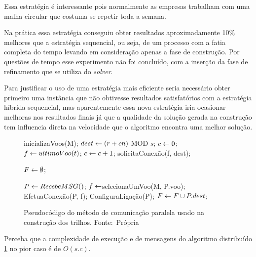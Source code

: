 Essa estratégia é interessante pois normalmente as empresas trabalham com uma
malha circular que costuma se repetir toda a semana.

Na prática essa estratégia conseguiu obter resultados aproximadamente 10\%
melhores que a estratégia sequencial, ou seja, de um processo com a fatia
completa do tempo levando em consideração apenas a fase de construção. Por
questões de tempo esse experimento não foi concluído, com a inserção da fase de
refinamento que se utiliza do \textit{solver}.

Para justificar o uso de uma estratégia mais eficiente seria necessário obter
primeiro uma instância que não obtivesse resultados satisfatórios com a
estratégia híbrida sequencial, mas aparentemente essa nova estratégia iria
ocasionar melhoras nos resultados finais já que a qualidade da solução
gerada na construção tem influencia direta na velocidade que o algoritmo
encontra uma melhor solução.

\begin{figure}[h]
\caption{Pseudocódigo do método de comunicação paralela usado na construção dos
trilhos.
\newline
\mbox{Fonte: Própria}}\label{alg:metodoparalel}
\begin{programma}

\STATE inicializaVoos(M);
\STATE $dest \leftarrow (r + cn)$ MOD $s$;
\STATE $c \leftarrow 0$;
\STATE $f \leftarrow ultimoVoo(t)$;
	\STATE $c \leftarrow c + 1$;
	\STATE solicitaConexão(f, dest);
	\ENDIF
\ENDFOR

\ENDFOR

\STATE $F \leftarrow \emptyset$;

	\STATE $P \leftarrow RecebeMSG()$;
		\STATE $f \leftarrow $selecionaUmVoo(M, P.voo);
			\STATE EfetuaConexão(P, f);
		\ENDIF
		\STATE ConfiguraLigação(P);
		\STATE $F \leftarrow F \cup P.dest$;
	\ENDIF 
	
\ENDWHILE

\ENDALGORITHM
\end{programma}
\end{figure}

Perceba que a complexidade de execução e de mensagens do algoritmo distribuído
\ref{alg:metodoparalel} no pior caso é de $O(s.c)$.


 
 